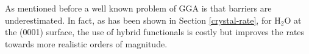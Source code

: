 \documentclass[11pt,DIV=13,BCOR=5mm,a4paper,headinclude]{scrbook}
\begin{document}

As mentioned before a well known problem of GGA is that barriers are underestimated\cite{Zhao05}.
In fact, as has been shown in Section \ref{crystal-rate}, for H$_2$O at the (0001) surface, the use of hybrid functionals is costly but improves the rates towards more realistic orders of magnitude.
\end{document}

